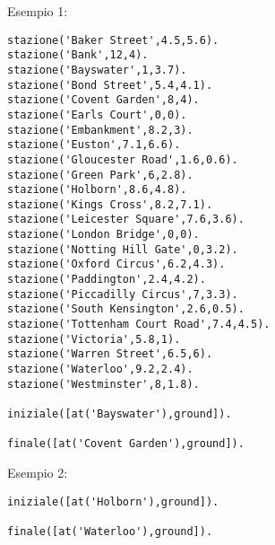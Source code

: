 Esempio 1:

\begin{lstlisting}
stazione('Baker Street',4.5,5.6).
stazione('Bank',12,4).
stazione('Bayswater',1,3.7).
stazione('Bond Street',5.4,4.1).
stazione('Covent Garden',8,4).
stazione('Earls Court',0,0).
stazione('Embankment',8.2,3).
stazione('Euston',7.1,6.6).
stazione('Gloucester Road',1.6,0.6).
stazione('Green Park',6,2.8).
stazione('Holborn',8.6,4.8).
stazione('Kings Cross',8.2,7.1).
stazione('Leicester Square',7.6,3.6).
stazione('London Bridge',0,0).
stazione('Notting Hill Gate',0,3.2).
stazione('Oxford Circus',6.2,4.3).
stazione('Paddington',2.4,4.2).
stazione('Piccadilly Circus',7,3.3).
stazione('South Kensington',2.6,0.5).
stazione('Tottenham Court Road',7.4,4.5).
stazione('Victoria',5.8,1).
stazione('Warren Street',6.5,6).
stazione('Waterloo',9.2,2.4).
stazione('Westminster',8,1.8).

iniziale([at('Bayswater'),ground]).

finale([at('Covent Garden'),ground]).
\end{lstlisting}

Esempio 2:

\begin{lstlisting}
iniziale([at('Holborn'),ground]).

finale([at('Waterloo'),ground]).
\end{lstlisting}